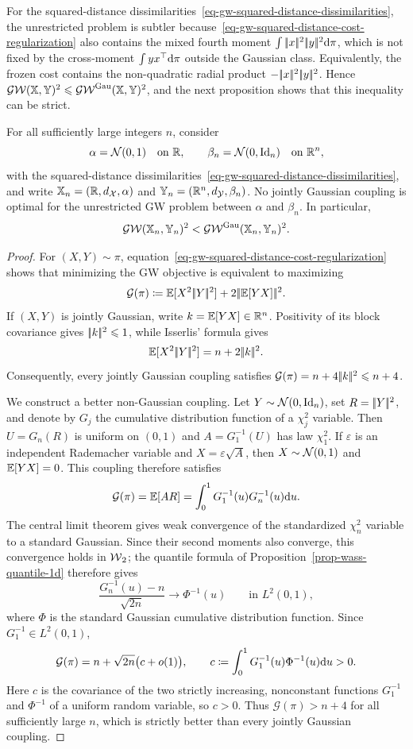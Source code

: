 For the squared-distance dissimilarities~\eqref{eq-gw-squared-distance-dissimilarities}, the unrestricted problem is subtler because~\eqref{eq-gw-squared-distance-cost-regularization} also contains the mixed fourth moment $\int|\!| x |\!|^2|\!| y |\!|^2\mathrm{d}\pi$, which is not fixed by the cross-moment $\int yx^\top\mathrm{d}\pi$ outside the Gaussian class. Equivalently, the frozen cost contains the non-quadratic radial product $-|\!| x |\!|^2|\!| y |\!|^2$. Hence
$\operatorname{\mathcal{GW}}(\mathbb{X},\mathbb{Y})^2\leqslant\operatorname{\mathcal{GW}}^{\mathrm{Gau}}(\mathbb{X},\mathbb{Y})^2$, and the next proposition shows that this inequality can be strict.

\begin{prop}\label{prop-gw-gaussian-closure-fails}
	For all sufficiently large integers $n$, consider
	\[
		\alpha=\mathcal{N}(0,1)\quad\text{on }\mathbb{R},
		\qquad
		\beta_n=\mathcal{N}(0,\mathrm{Id}_n)\quad\text{on }\mathbb{R}^n,
	\]
	with the squared-distance dissimilarities~\eqref{eq-gw-squared-distance-dissimilarities}, and write $\mathbb{X}_n=(\mathbb{R},d_{\mathcal{X}},\alpha)$ and $\mathbb{Y}_n=(\mathbb{R}^n,d_{\mathcal{Y}},\beta_n)$. No jointly Gaussian coupling is optimal for the unrestricted GW problem between $\alpha$ and $\beta_n$. In particular,
	\[
		\operatorname{\mathcal{GW}}(\mathbb{X}_n,\mathbb{Y}_n)^2<\operatorname{\mathcal{GW}}^{\mathrm{Gau}}(\mathbb{X}_n,\mathbb{Y}_n)^2.
	\]
\end{prop}
\begin{proof}
	For $(X,Y)\sim\pi$, equation~\eqref{eq-gw-squared-distance-cost-regularization} shows that minimizing the GW objective is equivalent to maximizing
	\[
		\mathcal G(\pi)
		\coloneqq
		\mathbb{E}[X^2|\!| Y |\!|^2]
		+
		2|\!| \mathbb{E}[YX] |\!|^2.
	\]
	If $(X,Y)$ is jointly Gaussian, write $k=\mathbb{E}[YX]\in\mathbb{R}^n$. Positivity of its block covariance gives $|\!| k |\!|^2\leqslant1$, while Isserlis' formula gives
	\[
		\mathbb{E}[X^2|\!| Y |\!|^2]=n+2|\!| k |\!|^2.
	\]
	Consequently, every jointly Gaussian coupling satisfies $\mathcal G(\pi)=n+4|\!| k |\!|^2\leqslant n+4$.

	We construct a better non-Gaussian coupling. Let $Y\sim\mathcal{N}(0,\mathrm{Id}_n)$, set $R=|\!| Y |\!|^2$, and denote by $G_j$ the cumulative distribution function of a $\chi_j^2$ variable. Then $U=G_n(R)$ is uniform on $(0,1)$ and $A=G_1^{-1}(U)$ has law $\chi_1^2$. If $\varepsilon$ is an independent Rademacher variable and $X=\varepsilon\sqrt A$, then $X\sim\mathcal{N}(0,1)$ and $\mathbb{E}[YX]=0$. This coupling therefore satisfies
	\[
		\mathcal G(\pi)
		=
		\mathbb{E}[AR]
		=
		\int_0^1G_1^{-1}(u)G_n^{-1}(u)\mathrm{d} u.
	\]
	The central limit theorem gives weak convergence of the standardized $\chi_n^2$ variable to a standard Gaussian. Since their second moments also converge, this convergence holds in $\operatorname{\mathcal{W}}_2$; the quantile formula of Proposition~\ref{prop-wass-quantile-1d} therefore gives
	\[
		\frac{G_n^{-1}(u)-n}{\sqrt{2n}}
		\longrightarrow
		\Phi^{-1}(u)
		\qquad\text{in }L^2(0,1),
	\]
	where $\Phi$ is the standard Gaussian cumulative distribution function. Since $G_1^{-1}\in L^2(0,1)$,
	\[
		\mathcal G(\pi)
		=
		n+\sqrt{2n}\bigl(c+o(1)\bigr),
		\qquad
		c\coloneqq\int_0^1G_1^{-1}(u)\Phi^{-1}(u)\mathrm{d} u>0.
	\]
	Here $c$ is the covariance of the two strictly increasing, nonconstant functions $G_1^{-1}$ and $\Phi^{-1}$ of a uniform random variable, so $c>0$. Thus $\mathcal G(\pi)>n+4$ for all sufficiently large $n$, which is strictly better than every jointly Gaussian coupling.
\end{proof}


